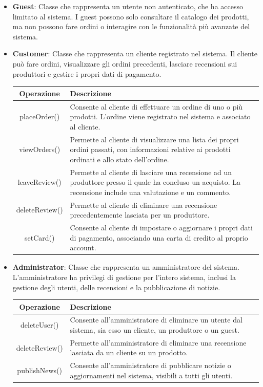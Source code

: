 \begin{itemize}
\item \textbf{Guest}:
Classe che rappresenta un utente non autenticato, che ha accesso limitato al sistema. I guest possono solo consultare il catalogo dei prodotti, ma non possono fare ordini o interagire con le funzionalità più avanzate del sistema.

\item \textbf{Customer}:
Classe che rappresenta un cliente registrato nel sistema. Il cliente può fare ordini, visualizzare gli ordini precedenti, lasciare recensioni sui produttori e gestire i propri dati di pagamento.
\begin{table}[!htbp]
    \centering
    \begin{tabularx}{\textwidth}{| c | X |}
    \hline
         \textbf{Operazione} & \textbf{Descrizione} \\
         \hline
         placeOrder() & Consente al cliente di effettuare un ordine di uno o più prodotti. L'ordine viene registrato nel sistema e associato al cliente. \\
         \hline
         viewOrders() & Permette al cliente di visualizzare una lista dei propri ordini passati, con informazioni relative ai prodotti ordinati e allo stato dell'ordine. \\
         \hline
         leaveReview() & Permette al cliente di lasciare una recensione ad un produttore presso il quale ha concluso un acquisto. La recensione include una valutazione e un commento. \\
         \hline
         deleteReview() & Permette al cliente di eliminare una recensione precedentemente lasciata per un produttore. \\
         \hline
         setCard() & Consente al cliente di impostare o aggiornare i propri dati di pagamento, associando una carta di credito al proprio account. \\
         \hline
    \end{tabularx}
\end{table}

\item \textbf{Administrator}:
Classe che rappresenta un amministratore del sistema. L'amministratore ha privilegi di gestione per l'intero sistema, inclusi la gestione degli utenti, delle recensioni e la pubblicazione di notizie.
\begin{table}[!htbp]
    \centering
    \begin{tabularx}{\textwidth}{| c | X |}
    \hline
         \textbf{Operazione} & \textbf{Descrizione} \\
         \hline
         deleteUser() & Consente all'amministratore di eliminare un utente dal sistema, sia esso un cliente, un produttore o un guest. \\
         \hline
         deleteReview() & Permette all'amministratore di eliminare una recensione lasciata da un cliente su un prodotto. \\
         \hline
         publishNews() & Consente all'amministratore di pubblicare notizie o aggiornamenti nel sistema, visibili a tutti gli utenti. \\
         \hline
    \end{tabularx}
\end{table}


\end{itemize}
